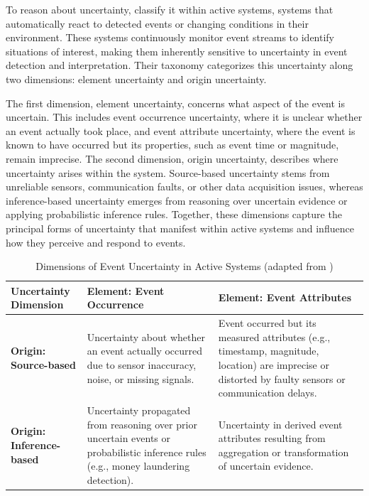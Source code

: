 To reason about uncertainty, \citet{wasserkrug2006taxonomy} classify it within active systems, systems that automatically react to detected events or changing conditions in their environment. These systems continuously monitor event streams to identify situations of interest, making them inherently sensitive to uncertainty in event detection and interpretation. Their taxonomy categorizes this uncertainty along two dimensions: element uncertainty and origin uncertainty.

The first dimension, element uncertainty, concerns what aspect of the event is uncertain. This includes event occurrence uncertainty, where it is unclear whether an event actually took place, and event attribute uncertainty, where the event is known to have occurred but its properties, such as event time or magnitude, remain imprecise. The second dimension, origin uncertainty, describes where uncertainty arises within the system. Source-based uncertainty stems from unreliable sensors, communication faults, or other data acquisition issues, whereas inference-based uncertainty emerges from reasoning over uncertain evidence or applying probabilistic inference rules. Together, these dimensions capture the principal forms of uncertainty that manifest within active systems and influence how they perceive and respond to events.



\begin{table}[H]
\centering
\caption{Dimensions of Event Uncertainty in Active Systems (adapted from \citealt{wasserkrug2006taxonomy})}
\label{tab:uncertainty-dimensions}
\begin{tabular}{|p{4cm}|p{5.5cm}|p{5.5cm}|}
\hline
\textbf{Uncertainty Dimension} & \textbf{Element: Event Occurrence} & \textbf{Element: Event Attributes} \\
\hline
\textbf{Origin: Source-based} &
Uncertainty about whether an event actually occurred due to sensor inaccuracy, noise, or missing signals. &
Event occurred but its measured attributes (e.g., timestamp, magnitude, location) are imprecise or distorted by faulty sensors or communication delays. \\
\hline
\textbf{Origin: Inference-based} &
Uncertainty propagated from reasoning over prior uncertain events or probabilistic inference rules (e.g., money laundering detection). &
Uncertainty in derived event attributes resulting from aggregation or transformation of uncertain evidence. \\
\hline
\end{tabular}
\end{table}

